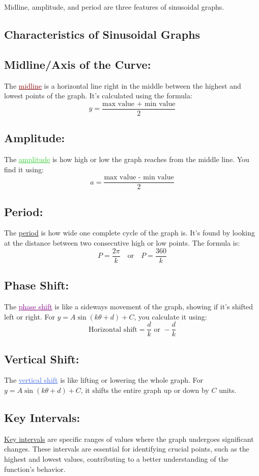 \documentclass[12pt,a4paper]{article}
\begin{document}
Midline, amplitude, and period are three features of sinusoidal graphs.
\newpage
\subsection{Characteristics of Sinusoidal Graphs}
\subsection{Midline/Axis of the Curve:}
The \textcolor{Maroon}{\underline{midline}} is a horizontal line right in the middle between the highest and lowest points of the graph. It's calculated using the formula:
\[y = \frac{\text{max value + min value}}{2}\]

\subsection{Amplitude:}
The \textcolor{LimeGreen}{\underline{amplitude}} is how high or low the graph reaches from the middle line. You find it using:
\[a = \frac{\text{max value - min value}}{2}\]

\subsection{Period:}
The \textcolor{Periwinkle}{\underline{period}} is how wide one complete cycle of the graph is. It's found by looking at the distance between two consecutive high or low points. The formula is:
\[P = \frac{2\pi}{k}\quad \text{or} \quad P = \frac{360}{k} \]

\subsection{Phase Shift:}
The \textcolor{Purple}{\underline{phase shift}} is like a sideways movement of the graph, showing if it's shifted left or right. For \(y = A \sin(k \theta + d) + C\), you calculate it using:
\[\text{Horizontal shift} = \frac{d}{k} \text{ or }  -\frac{d}{k}\]

\subsection{Vertical Shift:}
The \textcolor{RoyalBlue}{\underline{vertical shift}} is like lifting or lowering the whole graph. For \(y = A \sin(k \theta + d) + C\), it shifts the entire graph up or down by \(C\) units.

\subsection{Key Intervals:}
\textcolor{OliveGreen}{\underline{Key intervals}} are specific ranges of values where the graph undergoes significant changes. These intervals are essential for identifying crucial points, such as the highest and lowest values, contributing to a better understanding of the function's behavior.
\end{document}
